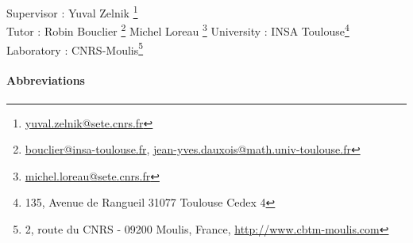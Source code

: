 \documentclass{article}
\begin{document}
\begin{titlepage}

\vspace*{3cm}

\begin{flushleft}
\hfill 
Supervisor : Yuval Zelnik \footnote{\url{yuval.zelnik@sete.cnrs.fr}} \\
Tutor : Robin Bouclier \footnote{\url{bouclier@insa-toulouse.fr}, \url{jean-yves.dauxois@math.univ-toulouse.fr}}  \hfill 
Michel Loreau \footnote{\url{michel.loreau@sete.cnrs.fr}}
University : INSA Toulouse\footnote{135, Avenue de Rangueil 31077 Toulouse Cedex 4} \hfill
Laboratory : CNRS-Moulis\footnote{2, route du CNRS - 09200 Moulis, France, \url{http://www.cbtm-moulis.com}} \\
\end{flushleft}

\end{titlepage}



\newpage

\paragraph{}


\tableofcontents



\newpage
\listoffigures



\newpage
{}
\paragraph{Abbreviations}
\end{document}
